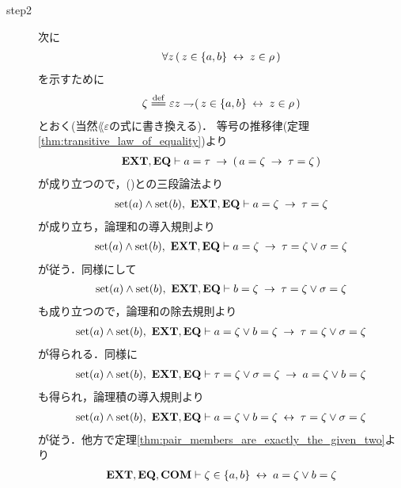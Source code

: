 \begin{sketch}
\begin{description}
			\item[step2]
				次に
				\begin{align}
					\forall z\, (\, z \in \{a,b\} \hspace{0.25em}\leftrightarrow\hspace{0.25em} z \in \rho\, )
				\end{align}
				を示すために
				\begin{align}
					\zeta \defeq \varepsilon z \negation (\, z \in \{a,b\} \lrarrow z \in \rho\, )
				\end{align}
				とおく(当然$\lang{\varepsilon}$の式に書き換える)．
				等号の推移律(定理\ref{thm:transitive_law_of_equality})より
				\begin{align}
					\mbox{{\bf EXT}},\mbox{{\bf EQ}} \vdash a = \tau \hspace{0.25em}\rightarrow\hspace{0.25em} (\, a = \zeta \hspace{0.25em}\rightarrow\hspace{0.25em} \tau = \zeta\, )
				\end{align}
				が成り立つので，()との三段論法より
				\begin{align}
					\operatorname*{set} (a) \wedge \operatorname*{set} (b),\ \mbox{{\bf EXT}},\mbox{{\bf EQ}} \vdash 
					a = \zeta \hspace{0.25em}\rightarrow\hspace{0.25em} \tau = \zeta
				\end{align}
				が成り立ち，論理和の導入規則より
				\begin{align}
					\operatorname*{set} (a) \wedge \operatorname*{set} (b),\ \mbox{{\bf EXT}},\mbox{{\bf EQ}} \vdash 
					a = \zeta \hspace{0.25em}\rightarrow\hspace{0.25em} \tau = \zeta \vee \sigma = \zeta
				\end{align}
				が従う．同様にして
				\begin{align}
					\operatorname*{set} (a) \wedge \operatorname*{set} (b),\ \mbox{{\bf EXT}},\mbox{{\bf EQ}} \vdash 
					b = \zeta \hspace{0.25em}\rightarrow\hspace{0.25em} \tau = \zeta \vee \sigma = \zeta
				\end{align}
				も成り立つので，論理和の除去規則より
				\begin{align}
					\operatorname*{set} (a) \wedge \operatorname*{set} (b),\ \mbox{{\bf EXT}},\mbox{{\bf EQ}} \vdash 
					a = \zeta \vee b = \zeta \hspace{0.25em}\rightarrow\hspace{0.25em} \tau = \zeta \vee \sigma = \zeta
				\end{align}
				が得られる．同様に
				\begin{align}
					\operatorname*{set} (a) \wedge \operatorname*{set} (b),\ \mbox{{\bf EXT}},\mbox{{\bf EQ}} \vdash 
					\tau = \zeta \vee \sigma = \zeta \hspace{0.25em}\rightarrow\hspace{0.25em} a = \zeta \vee b = \zeta
				\end{align}
				も得られ，論理積の導入規則より
				\begin{align}
					\operatorname*{set} (a) \wedge \operatorname*{set} (b),\ \mbox{{\bf EXT}},\mbox{{\bf EQ}} \vdash 
					a = \zeta \vee b = \zeta \hspace{0.25em}\leftrightarrow\hspace{0.25em} \tau = \zeta \vee \sigma = \zeta
				\end{align}
				が従う．他方で定理\ref{thm:pair_members_are_exactly_the_given_two}より
				\begin{align}
					\mbox{{\bf EXT}},\mbox{{\bf EQ}},\mbox{\bf COM} \vdash 
					\zeta \in \{a,b\} \hspace{0.25em}\leftrightarrow\hspace{0.25em} a = \zeta \vee b = \zeta
				\end{align}

\end{description}
\end{sketch}
